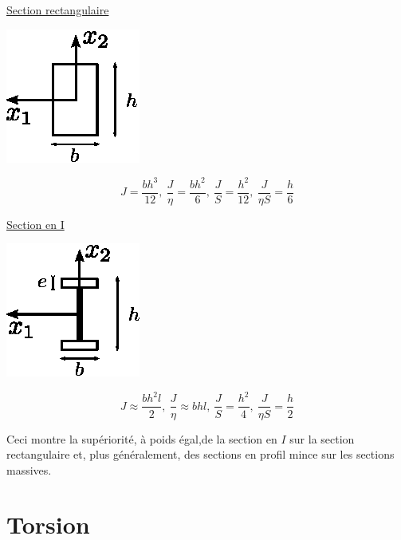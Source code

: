 \underline{Section rectangulaire}
\begin{multicols}{2}
    \begin{center}
        \includegraphics{../images/T1_Ch07-07}
    \end{center}
    \columnbreak
    \begin{displaymath}
        J = \frac{bh^3}{12},\ \frac{J}{\eta} = \frac{bh^2}{6},\ \frac{J}{S} = \frac{h^2}{12},\ \frac{J}{\eta S} = \frac{h}{6}
    \end{displaymath}
\end{multicols}
\underline{Section en I}
\begin{multicols}{2}
    \begin{center}
        \includegraphics{../images/T1_Ch07-08}
    \end{center}
    \columnbreak
    \begin{displaymath}
        J \approx \frac{bh^2l}{2},\ \frac{J}{\eta} \approx bhl,\ \frac{J}{S} = \frac{h^2}{4},\ \frac{J}{\eta S} = \frac{h}{2}
    \end{displaymath}
\end{multicols}
Ceci montre la supériorité, à poids égal,de la section en $I$ sur la section rectangulaire et, plus généralement, des sections en profil mince sur les sections massives.

\section{Torsion}
